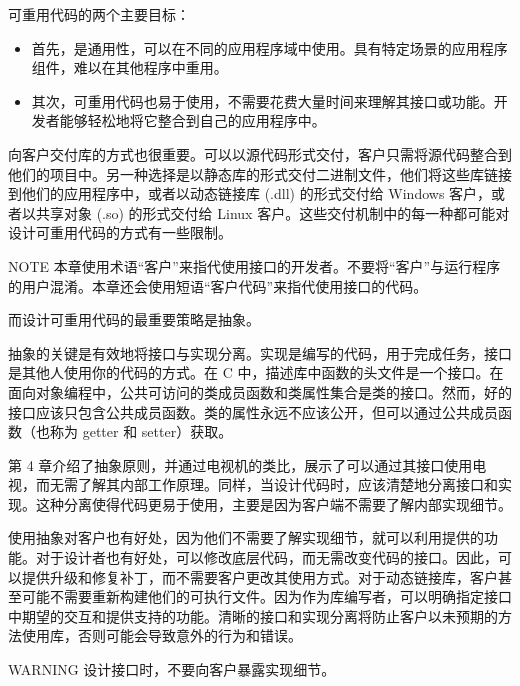 
可重用代码的两个主要目标：

\begin{itemize}
\item
首先，是通用性，可以在不同的应用程序域中使用。具有特定场景的应用程序组件，难以在其他程序中重用。

\item
其次，可重用代码也易于使用，不需要花费大量时间来理解其接口或功能。开发者能够轻松地将它整合到自己的应用程序中。
\end{itemize}

向客户交付库的方式也很重要。可以以源代码形式交付，客户只需将源代码整合到他们的项目中。另一种选择是以静态库的形式交付二进制文件，他们将这些库链接到他们的应用程序中，或者以动态链接库 (.dll) 的形式交付给 Windows 客户，或者以共享对象 (.so) 的形式交付给 Linux 客户。这些交付机制中的每一种都可能对设计可重用代码的方式有一些限制。

\begin{myNotic}{NOTE}
本章使用术语“客户”来指代使用接口的开发者。不要将“客户”与运行程序的用户混淆。本章还会使用短语“客户代码”来指代使用接口的代码。
\end{myNotic}

而设计可重用代码的最重要策略是抽象。


抽象的关键是有效地将接口与实现分离。实现是编写的代码，用于完成任务，接口是其他人使用你的代码的方式。在 C 中，描述库中函数的头文件是一个接口。在面向对象编程中，公共可访问的类成员函数和类属性集合是类的接口。然而，好的接口应该只包含公共成员函数。类的属性永远不应该公开，但可以通过公共成员函数（也称为 getter 和 setter）获取。

第 4 章介绍了抽象原则，并通过电视机的类比，展示了可以通过其接口使用电视，而无需了解其内部工作原理。同样，当设计代码时，应该清楚地分离接口和实现。这种分离使得代码更易于使用，主要是因为客户端不需要了解内部实现细节。

使用抽象对客户也有好处，因为他们不需要了解实现细节，就可以利用提供的功能。对于设计者也有好处，可以修改底层代码，而无需改变代码的接口。因此，可以提供升级和修复补丁，而不需要客户更改其使用方式。对于动态链接库，客户甚至可能不需要重新构建他们的可执行文件。因为作为库编写者，可以明确指定接口中期望的交互和提供支持的功能。清晰的接口和实现分离将防止客户以未预期的方法使用库，否则可能会导致意外的行为和错误。

\begin{myWarning}{WARNING}
设计接口时，不要向客户暴露实现细节。
\end{myWarning}

